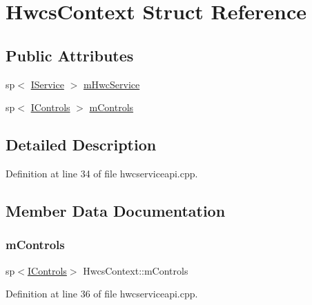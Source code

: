 \hypertarget{structHwcsContext}{}\section{Hwcs\+Context Struct Reference}
\label{structHwcsContext}
\subsection*{Public Attributes}
\begin{DoxyCompactItemize}
\item 
sp$<$ \mbox{\hyperlink{classhwcomposer_1_1IService}{I\+Service}} $>$ \mbox{\hyperlink{structHwcsContext_abf6c1271671afe3edc9b193df2fa320d}{m\+Hwc\+Service}}
\item 
sp$<$ \mbox{\hyperlink{classhwcomposer_1_1IControls}{I\+Controls}} $>$ \mbox{\hyperlink{structHwcsContext_a70d64a8f6b439384a60d911982ecfb1a}{m\+Controls}}
\end{DoxyCompactItemize}


\subsection{Detailed Description}


Definition at line 34 of file hwcserviceapi.\+cpp.



\subsection{Member Data Documentation}
\mbox{\label{structHwcsContext_a70d64a8f6b439384a60d911982ecfb1a}} 
\subsubsection{\texorpdfstring{m\+Controls}{mControls}}
{\footnotesize\ttfamily sp$<$\mbox{\hyperlink{classhwcomposer_1_1IControls}{I\+Controls}}$>$ Hwcs\+Context\+::m\+Controls}



Definition at line 36 of file hwcserviceapi.\+cpp.

\mbox{\label{structHwcsContext_abf6c1271671afe3edc9b193df2fa320d}} 
